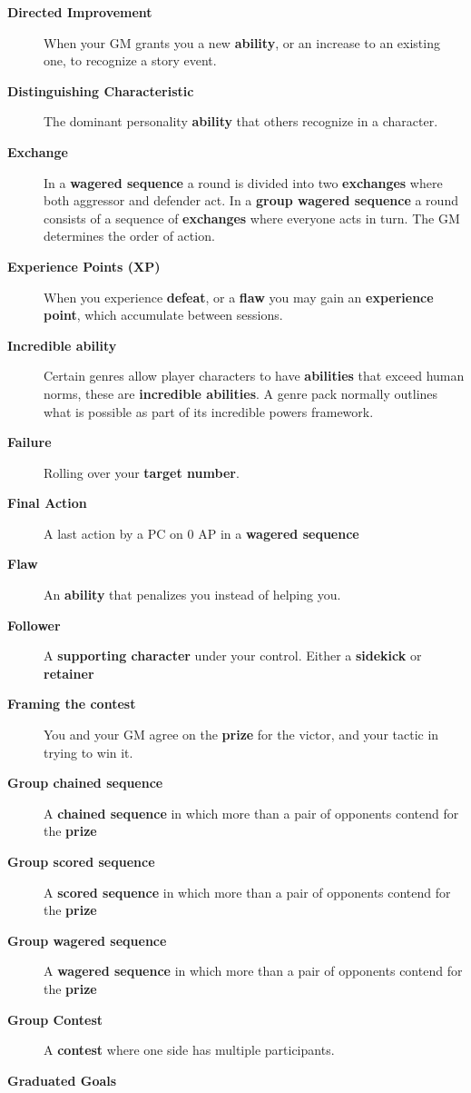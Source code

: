 \documentclass[
  11pt,
]{article}
\begin{document}
\begin{description}
\item[\textbf{Directed Improvement}]
When your GM grants you a new \textbf{ability}, or an increase to an
existing one, to recognize a story event.
\item[\textbf{Distinguishing Characteristic}]
The dominant personality \textbf{ability} that others recognize in a
character.
\item[\textbf{Exchange}]
In a \textbf{wagered sequence} a round is divided into two
\textbf{exchanges} where both aggressor and defender act. In a
\textbf{group wagered sequence} a round consists of a sequence of
\textbf{exchanges} where everyone acts in turn. The GM determines the
order of action.
\item[\textbf{Experience Points (XP)}]
When you experience \textbf{defeat}, or a \textbf{flaw} you may gain an
\textbf{experience point}, which accumulate between sessions.
\item[\textbf{Incredible ability}]
Certain genres allow player characters to have \textbf{abilities} that
exceed human norms, these are \textbf{incredible abilities}. A genre
pack normally outlines what is possible as part of its incredible powers
framework.
\item[\textbf{Failure}]
Rolling over your \textbf{target number}.
\item[\textbf{Final Action}]
A last action by a PC on 0 AP in a \textbf{wagered sequence}
\item[\textbf{Flaw}]
An \textbf{ability} that penalizes you instead of helping you.
\item[\textbf{Follower}]
A \textbf{supporting character} under your control. Either a
\textbf{sidekick} or \textbf{retainer}
\item[\textbf{Framing the contest}]
You and your GM agree on the \textbf{prize} for the victor, and your
tactic in trying to win it.
\item[\textbf{Group chained sequence}]
A \textbf{chained sequence} in which more than a pair of opponents
contend for the \textbf{prize}
\item[\textbf{Group scored sequence}]
A \textbf{scored sequence} in which more than a pair of opponents
contend for the \textbf{prize}
\item[\textbf{Group wagered sequence}]
A \textbf{wagered sequence} in which more than a pair of opponents
contend for the \textbf{prize}
\item[\textbf{Group Contest}]
A \textbf{contest} where one side has multiple participants.
\item[\textbf{Graduated Goals}]

\end{description}
\end{document}
